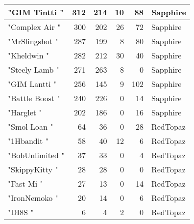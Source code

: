 \documentclass{article}
\begin{document}
\begin{table}[htbp]
\begin{tabular}{|l|r|r|r|r|l|}
"GIM Tintti " & 312 & 214 & 10 & 88 & Sapphire \\ \hline
"Complex Air " & 300 & 202 & 26 & 72 & Sapphire \\ \hline
"MrSlingshot " & 287 & 199 & 8 & 80 & Sapphire \\ \hline
"Kheldwin " & 282 & 212 & 30 & 40 & Sapphire \\ \hline
"Steely Lamb " & 271 & 263 & 8 & 0 & Sapphire \\ \hline
"GIM Lantti " & 256 & 145 & 9 & 102 & Sapphire \\ \hline
"Battle Boost " & 240 & 226 & 0 & 14 & Sapphire \\ \hline
"Harglet " & 202 & 186 & 0 & 16 & Sapphire \\ \hline
"Smol Loan " & 64 & 36 & 0 & 28 & RedTopaz \\ \hline
"1Hbandit " & 58 & 40 & 12 & 6 & RedTopaz \\ \hline
"BobUnlimited " & 37 & 33 & 0 & 4 & RedTopaz \\ \hline
"SkippyKitty " & 28 & 28 & 0 & 0 & RedTopaz \\ \hline
"Fast Mi " & 27 & 13 & 0 & 14 & RedTopaz \\ \hline
"IronNemoko " & 20 & 14 & 0 & 6 & RedTopaz \\ \hline
"DI8S " & 6 & 4 & 2 & 0 & RedTopaz \\ \hline
\end{tabular}
\end{table}
\end{document}
